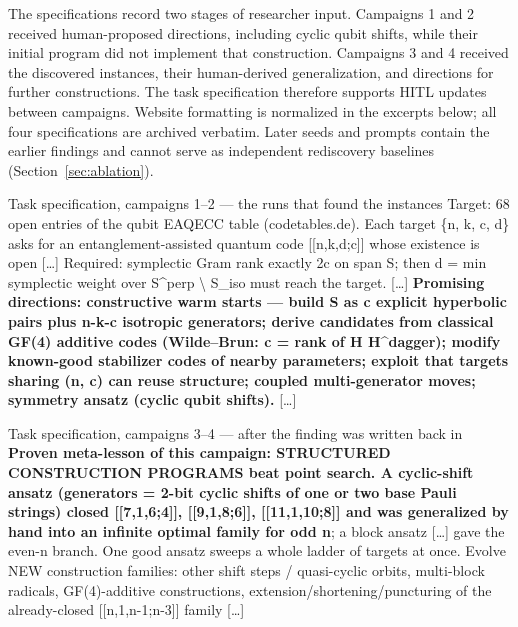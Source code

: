 %
The specifications record two stages of researcher input. Campaigns 1
and 2 received human-proposed directions, including cyclic qubit shifts,
while their initial program did not implement that construction.
Campaigns 3 and 4 received the discovered instances, their human-derived
generalization, and directions for further constructions. The task
specification therefore supports HITL updates between campaigns.
Website formatting is normalized in the excerpts below; all four
specifications are archived verbatim. Later seeds and prompts
contain the earlier findings and cannot serve as independent rediscovery
baselines (Section~\ref{sec:ablation}).

\begin{promptbox}{Task specification, campaigns 1--2 --- the runs that found the instances}
\footnotesize\ttfamily
Target: 68 open entries of the qubit EAQECC table (codetables.de). Each
target \{n, k, c, d\} asks for an entanglement-assisted quantum code
[[n,k,d;c]] whose existence is open [\dots] Required: symplectic Gram
rank exactly 2c on span S; then d = min symplectic weight over
S\textasciicircum perp \textbackslash{} S\_iso must reach the target.
[\dots] \textbf{Promising directions: constructive warm starts --- build S
as c explicit hyperbolic pairs plus n-k-c isotropic generators; derive
candidates from classical GF(4) additive codes (Wilde--Brun: c = rank of
H H\textasciicircum dagger); modify known-good stabilizer codes of nearby
parameters; exploit that targets sharing (n, c) can reuse structure;
coupled multi-generator moves; symmetry ansatz (cyclic qubit shifts).}
[\dots]
\end{promptbox}

\begin{promptbox}{Task specification, campaigns 3--4 --- after the finding was written back in}
\footnotesize\ttfamily
[\dots] \textbf{Proven meta-lesson of this campaign: STRUCTURED
CONSTRUCTION PROGRAMS beat point search. A cyclic-shift ansatz
(generators = 2-bit cyclic shifts of one or two base Pauli strings)
closed [[7,1,6;4]], [[9,1,8;6]], [[11,1,10;8]] and was generalized by
hand into an infinite optimal family for odd n}; a block ansatz [\dots]
gave the even-n branch. One good ansatz sweeps a whole ladder of targets
at once. Evolve NEW construction families: other shift steps /
quasi-cyclic orbits, multi-block radicals, GF(4)-additive constructions,
extension/shortening/puncturing of the already-closed [[n,1,n-1;n-3]]
family [\dots]
\end{promptbox}
